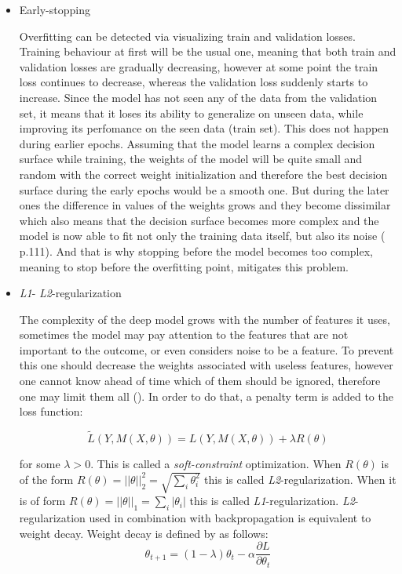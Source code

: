 \begin{itemize}
	\item Early-stopping

	Overfitting can be detected via visualizing train and validation losses. Training behaviour at first will be the usual one, meaning that both train and validation losses are gradually decreasing, however at some point the train loss continues to decrease, whereas the validation loss suddenly starts to increase. Since the model has not seen any of the data from the validation set, it means that it loses its ability to generalize on unseen data, while improving its perfomance on the seen data (train set). This does not happen during earlier epochs. Assuming that the model learns a complex decision surface while training, the weights of the model will be quite small and random with the correct weight initialization and therefore the best decision surface during the early epochs would be a smooth one. But during the later ones the difference in values of the weights grows and they become dissimilar which also means that the decision surface becomes more complex and the model is now able to fit not only the training data itself, but also its noise (\cite{mitchell_1997} p.111). And that is why stopping before the model becomes too complex, meaning to stop before the overfitting point, mitigates this problem.

	\item \emph{L1}- \emph{L2}-regularization

	The complexity of the deep model grows with the number of features it uses, sometimes the model may pay attention to the features that are not important to the outcome, or even considers noise to be a feature. To prevent this one should decrease the weights associated with useless features, however one cannot know ahead of time which of them should be ignored, therefore one may limit them all (\cite{Ying_2019}). In order to do that, a penalty term is added to the loss function:

	\begin{equation}
	\tilde{L}(Y, M(X, \theta)) = L(Y, M(X, \theta)) + \lambda R(\theta)
	\end{equation}

	for some $\lambda > 0$. This is called a \emph{soft-constraint} optimization. When $R(\theta)$ is of the form $R(\theta) = ||\theta||^2_2 = \sqrt{\sum\limits_i \theta_i^2}$ this is called \emph{L2}-regularization. When it is of form $R(\theta) = ||\theta||_1 = \sum\limits_i |\theta_i|$ this is called \emph{L1}-regularization. \emph{L2}-regularization used in combination with backpropagation is equivalent to weight decay. Weight decay is defined by \cite{Hanson_1988} as follows:
	\begin{equation}
		\theta_{t+1} = (1 - \lambda)\theta_t - \alpha \frac{\partial L}{\partial \theta_t}
	\end{equation}


\end{itemize}
